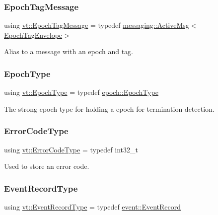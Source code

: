 \subsubsection{\texorpdfstring{Epoch\+Tag\+Message}{EpochTagMessage}}
{\footnotesize\ttfamily using \hyperlink{namespacevt_a4ccc13b06bff8a4a35426a1a082a95a9}{vt\+::\+Epoch\+Tag\+Message} = typedef \hyperlink{structvt_1_1messaging_1_1_active_msg}{messaging\+::\+Active\+Msg}$<$\hyperlink{namespacevt_af23b58014ced6898422213a0e5e6a27a}{Epoch\+Tag\+Envelope}$>$}



Alias to a message with an epoch and tag. 

\mbox{\label{namespacevt_a81d11b28122d43bf9834577e4a06440f}} 
\subsubsection{\texorpdfstring{Epoch\+Type}{EpochType}}
{\footnotesize\ttfamily using \hyperlink{namespacevt_a81d11b28122d43bf9834577e4a06440f}{vt\+::\+Epoch\+Type} = typedef \hyperlink{structvt_1_1epoch_1_1_epoch_type}{epoch\+::\+Epoch\+Type}}



The strong epoch type for holding a epoch for termination detection. 

\mbox{\label{namespacevt_a793764d753923abc3d32929870beb485}} 
\subsubsection{\texorpdfstring{Error\+Code\+Type}{ErrorCodeType}}
{\footnotesize\ttfamily using \hyperlink{namespacevt_a793764d753923abc3d32929870beb485}{vt\+::\+Error\+Code\+Type} = typedef int32\+\_\+t}



Used to store an error code. 

\mbox{\label{namespacevt_a2dc2f149222f88a250ec9a13db36865d}} 
\subsubsection{\texorpdfstring{Event\+Record\+Type}{EventRecordType}}
{\footnotesize\ttfamily using \hyperlink{namespacevt_a2dc2f149222f88a250ec9a13db36865d}{vt\+::\+Event\+Record\+Type} = typedef \hyperlink{structvt_1_1event_1_1_event_record}{event\+::\+Event\+Record}}

